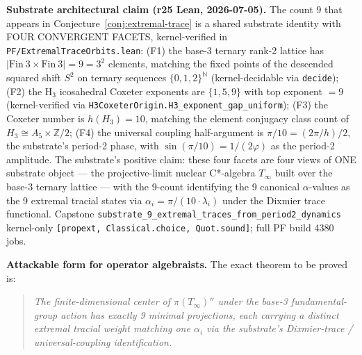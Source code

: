 \documentclass[11pt,a4paper]{amsart}
\theoremstyle{plain}
\theoremstyle{definition}
\begin{document}
\textbf{Substrate architectural claim (r25 Lean, 2026-07-05).} The count 9 that appears in Conjecture~\ref{conj:extremal-trace} is a shared substrate identity with FOUR CONVERGENT FACETS, kernel-verified in \texttt{PF/ExtremalTraceOrbits.lean}: (F1) the base-3 ternary rank-2 lattice has $|\mathrm{Fin}~3 \times \mathrm{Fin}~3| = 9 = 3^2$ elements, matching the fixed points of the descended squared shift $S^2$ on ternary sequences $\{0,1,2\}^{\mathbb{N}}$ (kernel-decidable via \texttt{decide}); (F2) the H$_3$ icosahedral Coxeter exponents are $\{1, 5, 9\}$ with top exponent $= 9$ (kernel-verified via \texttt{H3CoxeterOrigin.H3\_exponent\_gap\_uniform}); (F3) the Coxeter number is $h(H_3) = 10$, matching the element conjugacy class count of $H_3 \cong A_5 \times \mathbb{Z}/2$; (F4) the universal coupling half-argument is $\pi/10 = (2\pi/h)/2$, the substrate's period-2 phase, with $\sin(\pi/10) = 1/(2\varphi)$ as the period-2 amplitude. The substrate's positive claim: these four facets are four views of ONE substrate object — the projective-limit nuclear C*-algebra $T_\infty$ built over the base-3 ternary lattice — with the 9-count identifying the 9 canonical $\alpha$-values as the 9 extremal tracial states via $\alpha_i = \pi/(10 \cdot \lambda_i)$ under the Dixmier trace functional. Capstone \texttt{substrate\_9\_extremal\_traces\_from\_period2\_dynamics} kernel-only \texttt{[propext, Classical.choice, Quot.sound]}; full PF build 4380 jobs.

\textbf{Attackable form for operator algebraists.} The exact theorem to be proved is:

\begin{quote}
\emph{The finite-dimensional center of $\pi(T_\infty)''$ under the base-3 fundamental-group action has exactly 9 minimal projections, each carrying a distinct extremal tracial weight matching one $\alpha_i$ via the substrate's Dixmier-trace / universal-coupling identification.}
\end{quote}
\end{document}
